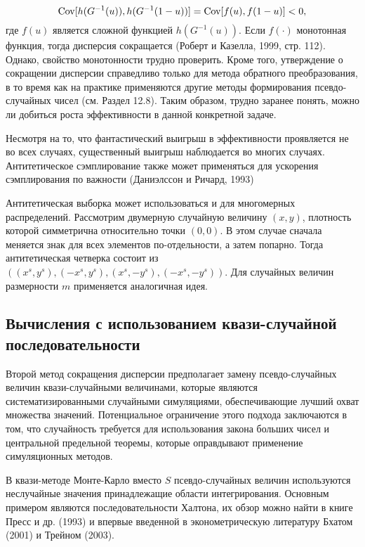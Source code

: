 \[
\mathrm{Cov}[h(G^{-1}(u)),h(G^{-1}(1-u))]=\mathrm{Cov}[f(u),f(1-u)]<0,
\] 
где $f(u)$ является сложной функцией $h(G^{-1}(u))$. Если $f(\cdot)$ монотонная функция, тогда дисперсия сокращается (Роберт и Казелла, 1999, стр. 112). Однако, свойство монотонности трудно проверить. Кроме того, утверждение о сокращении дисперсии справедливо только для метода обратного преобразования, в то время как на практике применяются другие методы формирования псевдо-случайных чисел (см. Раздел 12.8). Таким образом, трудно заранее понять, можно ли добиться роста эффективности в данной конкретной задаче.


Несмотря на то, что фантастический выигрыш в эффективности проявляется не во всех случаях, существенный выигрыш наблюдается во  многих случаях. Антитетическое сэмплирование также может применяться для ускорения сэмплирования по важности (Даниэлссон и Ричард, 1993)

Антитетическая выборка может использоваться и для многомерных распределений. Рассмотрим двумерную случайную величину $(x,y)$,  плотность которой симметрична относительно точки $(0,0)$. В этом случае сначала меняется знак для всех элементов по-отдельности, а затем попарно. Тогда антитетическая четверка состоит из $((x^s,y^s),(-x^s,y^s),(x^s,-y^s),(-x^s,-y^s))$. Для случайных величин размерности $m$ применяется аналогичная идея.

\subsection{Вычисления с использованием квази-случайной последовательности}

Второй метод сокращения дисперсии предполагает замену псевдо-случайных величин квази-случайными величинами, которые являются систематизированными случайными симуляциями, обеспечивающие лучший охват множества значений. Потенциальное ограничение этого подхода заключаются в том, что случайность требуется для использования закона больших чисел и центральной предельной теоремы, которые оправдывают применение симуляционных методов.

В квази-методе Монте-Карло вместо $S$ псевдо-случайных величин используются неслучайные значения принадлежащие области интегрирования. Основным примером являются последовательности Халтона, их обзор можно найти в книге Пресс и др. (1993) и впервые введенной в эконометрическую литературу Бхатом (2001) и Трейном (2003).

